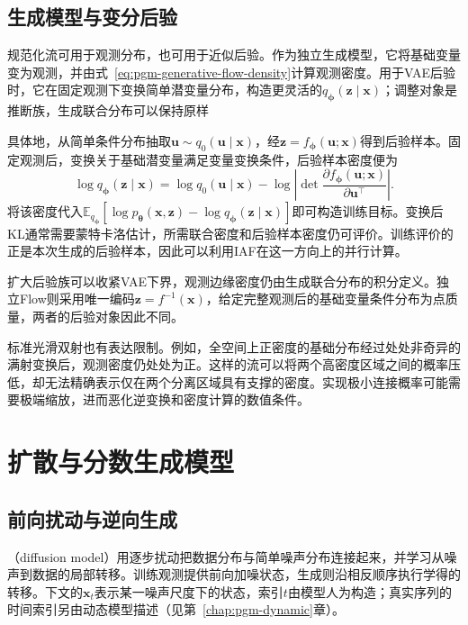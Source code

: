 \subsection{生成模型与变分后验}
\label{sec:pgm-generative-flow-roles}

规范化流可用于观测分布，也可用于近似后验。作为独立生成模型，它将基础变量变为观测，并由式~\eqref{eq:pgm-generative-flow-density}计算观测密度。用于VAE后验时，它在固定观测下变换简单潜变量分布，构造更灵活的$q_{\bm{\phi}}(\bm{z}\mid\bm{x})$；调整对象是推断族，生成联合分布可以保持原样

具体地，从简单条件分布抽取$\bm{u}\sim q_0(\bm{u}\mid\bm{x})$，经$\bm{z}=f_{\bm{\phi}}(\bm{u};\bm{x})$得到后验样本。固定观测后，变换关于基础潜变量满足变量变换条件，后验样本密度便为
\begin{equation}
  \label{eq:pgm-generative-flow-posterior}
  \log q_{\bm{\phi}}(\bm{z}\mid\bm{x})
  =\log q_0(\bm{u}\mid\bm{x})
    -\log\left|
       \det\frac{\partial f_{\bm{\phi}}(\bm{u};\bm{x})}
                     {\partial\bm{u}^{\top}}
      \right|.
\end{equation}
将该密度代入$\mathbb{E}_{q_{\bm{\phi}}}[\log p_{\bm{\theta}}(\bm{x},\bm{z})-\log q_{\bm{\phi}}(\bm{z}\mid\bm{x})]$即可构造训练目标。变换后KL通常需要蒙特卡洛估计，所需联合密度和后验样本密度仍可评价。训练评价的正是本次生成的后验样本，因此可以利用IAF在这一方向上的并行计算。

扩大后验族可以收紧VAE下界，观测边缘密度仍由生成联合分布的积分定义。独立Flow则采用唯一编码$\bm{z}=f^{-1}(\bm{x})$，给定完整观测后的基础变量条件分布为点质量，两者的后验对象因此不同。

标准光滑双射也有表达限制。例如，全空间上正密度的基础分布经过处处非奇异的满射变换后，观测密度仍处处为正。这样的流可以将两个高密度区域之间的概率压低，却无法精确表示仅在两个分离区域具有支撑的密度。实现极小连接概率可能需要极端缩放，进而恶化逆变换和密度计算的数值条件。

\section{扩散与分数生成模型}
\label{sec:pgm-generative-diffusion}

\subsection{前向扰动与逆向生成}
\label{sec:pgm-generative-forward-reverse}

（diffusion model）用逐步扰动把数据分布与简单噪声分布连接起来，并学习从噪声到数据的局部转移。训练观测提供前向加噪状态，生成则沿相反顺序执行学得的转移。下文的$\bm{x}_t$表示某一噪声尺度下的状态，索引$t$由模型人为构造；真实序列的时间索引另由动态模型描述（见第~\ref{chap:pgm-dynamic}章）。

